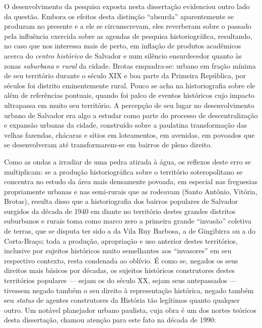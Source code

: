 O desenvolvimento da pesquisa exposta nesta dissertação evidenciou outro lado da questão. Embora os efeitos desta distinção ``absurda'' aparentemente se produzam no presente e a ele se circunscrevam, eles reverberam sobre o passado pela influência exercida sobre as agendas de pesquisa historiográfica, resultando, no caso que nos interessa mais de perto, em inflação de produtos acadêmicos acerca do \textit{centro histórico} de Salvador e num silêncio ensurdecedor quanto às zonas \textit{suburbana} e \textit{rural} da cidade. Brotas enquadra-se: urbano em fração mínima de seu território durante o século XIX e boa parte da Primeira República, por séculos foi distrito eminentemente rural. Pouco se acha na historiografia sobre ele além de referências pontuais, quando foi palco de eventos históricos cujo impacto ultrapassa em muito seu território. A percepção de seu lugar no desenvolvimento urbano de Salvador era algo a estudar como parte do processo de descentralização e expansão urbanas da cidade, construído sobre a paulatina transformação das velhas fazendas, chácaras e sítios em loteamentos, em avenidas, em povoados que se desenvolveram até transformarem-se em bairros de pleno direito.

Como as ondas a irradiar de uma pedra atirada à água, os reflexos deste erro se multiplicam: se a produção historiográfica sobre o território soteropolitano se concentra no estudo da área mais densamente povoada, em especial nas freguesias propriamente urbanas e nas semi-rurais que as rodeavam (Santo Antônio, Vitória, Brotas), resulta disso que a historiografia dos bairros populares de Salvador surgidos da década de 1940 em diante no território destes grandes distritos suburbanos e rurais toma como marco zero a primeira grande ``invasão'' coletiva de terras, que se disputa ter sido a da Vila Ruy Barbosa, a de Gingibirra ou a do Corta-Braço; toda a produção, apropriação e uso anterior destes territórios, inclusive por sujeitos históricos muito semelhantes aos ``invasores'' em seu respectivo contexto, resta condenada ao oblívio. É como se, negados os seus direitos mais básicos por décadas, os sujeitos históricos construtores destes territórios populares --- sejam os do século XX, sejam seus antepassados ---  tivessem negado também o seu direito à representação histórica, negado também seu \textit{status} de agentes construtores da História tão legítimos quanto qualquer outro. Um notável planejador urbano paulista, cuja obra é um dos nortes teóricos desta dissertação, chamou atenção para este fato na década de 1990:

